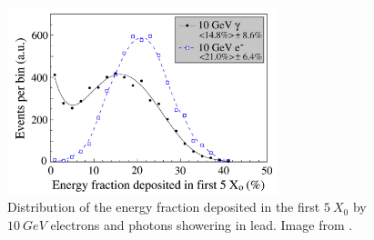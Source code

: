 \begin{figure}
	\centering
	\includegraphics[width=0.7\textwidth]{IMG/Cap2/em_start.png}
	\caption{Distribution of the energy fraction deposited in the first $5\ X_0$ by  $10\ GeV$ electrons and photons showering in lead. Image from \cite{Wigmans_e_gamma}.}
	\label{fig:em_start}
\end{figure}

